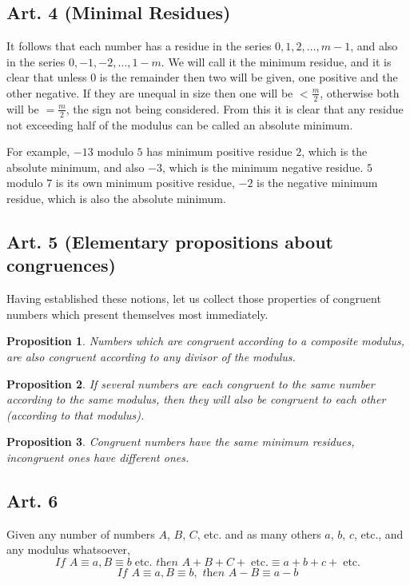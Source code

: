 \documentclass[10pt,psamsfonts,leqno,oneside,letterpaper]{amsart}
\theoremstyle{theorem}
\newtheorem{proposition}{Proposition}
\begin{document}
\subsection*{Art. 4 (Minimal Residues)}  It follows that each number has a residue in the series $0,1,2,\dots,m-1$, and also in the series $0,-1,-2,\dots,1-m$.  We will call it the minimum residue, and it is clear that unless $0$ is the remainder then two will be given, one positive and the other negative.  If they are unequal in size then one will be $< \frac{m}{2}$, otherwise both will be $=\frac{m}{2}$, the sign not being considered.  From this it is clear that any residue not exceeding half of the modulus can be called an absolute minimum.

For example, $-13$ modulo $5$ has minimum positive residue $2$, which is the absolute minimum, and also $-3$, which is the minimum negative residue.  $5$ modulo $7$ is its own minimum positive residue, $-2$ is the negative minimum residue, which is also the absolute minimum.

\subsection*{Art. 5 (Elementary propositions about congruences)}  Having established these notions, let us collect those properties of congruent numbers which present themselves most immediately.

\begin{proposition} Numbers which are congruent according to a composite modulus, are also congruent according to any divisor of the modulus. \end{proposition}

\begin{proposition} If several numbers are each congruent to the same number according to the same modulus, then they will also be congruent to each other (according to that modulus). \end{proposition}

\begin{proposition}  Congruent numbers have the same minimum residues, incongruent ones have different ones. \end{proposition}

\subsection*{Art. 6} Given any number of numbers $A$, $B$, $C$, etc. and as many others $a$, $b$, $c$, etc., and any modulus whatsoever, 
\[ \textit{If  }A \equiv a, B \equiv b \;\mathrm{ etc.} \textit{ then } A + B + C + \;\mathrm{etc.} \equiv a+b+c+\;\mathrm{etc.} \]
\[ \textit{If  }A \equiv a, B \equiv b, \textit{ then } A - B  \equiv a-b \]
\end{document}
